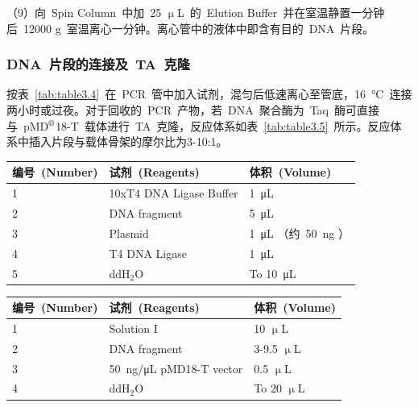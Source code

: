 （9）向\ Spin Column\ 中加\ 25 $\upmu$L\ 的\ Elution Buffer\ 并在室温静置一分钟后\ 12000 g\ 室温离心一分钟。离心管中的液体中即含有目的\ DNA\ 片段。

\subsubsection{DNA\ 片段的连接及\ TA\ 克隆}
按表\ \ref{tab:table3.4}\ 在\ PCR\ 管中加入试剂，混匀后低速离心至管底，\SI{16}{\degreeCelsius}\ 连接两小时或过夜。对于回收的\ PCR\ 产物，若\ DNA\ 聚合酶为\ Taq\ 酶可直接与\ pMD$^\text{\textregistered}$18-T\ 载体进行\ TA\ 克隆，反应体系如表\
\ref{tab:table3.5}\ 所示。反应体系中插入片段与载体骨架的摩尔比为3-10:1。
\begin{table}[!ht]
\centering
{
\par}
\small
\begin{tabular*}{\textwidth}[c]{@{\extracolsep{\fill}}lll}
\toprule
编号\ (Number) & 试剂\ (Reagents) & 体积\ (Volume)\\
\midrule
1 & 10xT4 DNA Ligase Buffer & \SI{1}{\micro\liter}\\
2 & DNA fragment & \SI{5}{\micro\liter}\\
3 & Plasmid & \SI{1}{\micro\liter} （约\ \SI{50}{\ng} ）\\
4 & T4 DNA Ligase & \SI{1}{\micro\liter}\\
5 & ddH$_2$O & To \SI{10}{\micro\liter}\\
\bottomrule
\end{tabular*}
\end{table}

\begin{table}[!ht]
\centering
{
\par}
\small
\begin{tabular*}{\textwidth}[c]{@{\extracolsep{\fill}}lll}
\toprule
编号\ (Number) & 试剂\ (Reagents) & 体积\ (Volume)\\
\midrule
1 & Solution I & 10 $\upmu$L\\
2 & DNA fragment & 3-9.5 $\upmu$L\\
3 & \SI{50}{\ng}/\si{\uL} pMD18-T vector & 0.5 $\upmu$L\\
4 & ddH$_2$O & To 20 $\upmu$L\\
\bottomrule
\end{tabular*}
\end{table}

